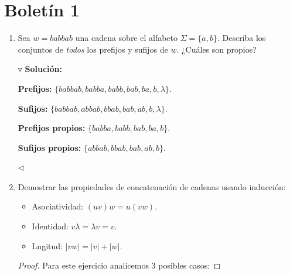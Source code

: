 \documentclass{article}
\begin{document}
\section*{\LARGE{Boletín 1}}
\begin{enumerate}
\item Sea $w = babbab$ una cadena sobre el alfabeto $\Sigma = \{a, b\}$.
  Describa los conjuntos de \textit{todos} los prefijos y sufijos de $w$.
  ¿Cuáles son propios?
  
  $\triangledown$ \textbf{Solución:}
  
  \textbf{Prefijos:} $\{babbab, babba, babb, bab, ba, b, \lambda\}$.
  
  \textbf{Sufijos:} $\{babbab, abbab, bbab, bab, ab, b, \lambda\}$.
  
  \textbf{Prefijos propios:} $\{babba, babb, bab, ba, b\}$.

  \textbf{Sufijos propios:} $\{abbab, bbab, bab, ab, b\}$.
  
  \hfill $\lhd$
  
\item Demostrar las propiedades de concatenación de cadenas usando inducción:
  \newcommand{\localtextbulletone}{\textcolor{gray}{\raisebox{.45ex}{\rule{.6ex}{.6ex}}}}
  \renewcommand{\labelitemi}{\localtextbulletone}
  \begin{itemize}
  \item Asociatividad: $(uv)w = u(vw)$.
  \item Identidad: $v\lambda = \lambda v = v$.
  \item Lngitud: $|vw| = |v| + |w|$.
  \end{itemize}
  \begin{proof} Para este ejercicio analicemos 3 posibles casos:
    
  \end{proof}
\end{enumerate}
\end{document}
